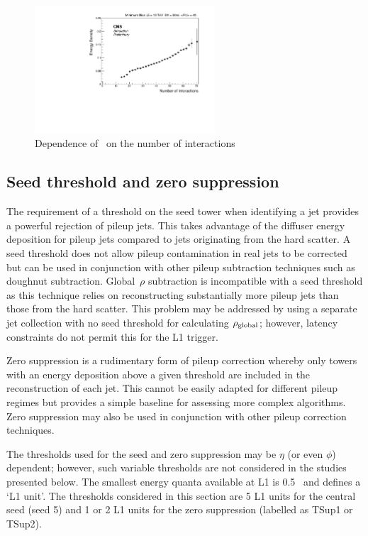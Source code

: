 \begin{figure}
\centering
    \includegraphics[width=0.6\textwidth]{./Figures/triggerUpgrade/threestrips}
  \caption{Dependence of \rhoC~on the number of interactions}
  \label{fig:threestripNint}
\end{figure}  

\subsection{Seed threshold and zero suppression}
\label{sec:seed_thresh}

The requirement of a threshold on the seed tower when identifying a jet
provides a powerful rejection of pileup jets. This takes advantage of the
diffuser energy deposition for pileup jets compared to jets originating from 
the hard scatter. A seed threshold does not allow pileup contamination in real jets to be corrected
but can be used in conjunction with other pileup subtraction techniques such as doughnut
subtraction. Global~$\rho$ subtraction is incompatible with a seed threshold as this technique relies
on reconstructing substantially more pileup jets than those from the hard scatter. 
This problem may be addressed by using a separate jet collection with no seed threshold
for calculating $\rho_{\text{global}}$; however, latency constraints do not permit this for the L1 trigger.

Zero suppression is a rudimentary form of pileup correction whereby only towers with
an energy deposition above a given threshold are included in the reconstruction of each jet.
This cannot be easily adapted for different pileup regimes but provides a simple baseline 
for assessing more complex algorithms. Zero suppression may also be used in conjunction
with other pileup correction techniques. 

The thresholds used for the seed and zero suppression may be $\eta$ (or even $\phi$) dependent; however,
such variable thresholds are not considered in the studies presented below. The smallest energy quanta
available at L1 is 0.5 \GeV~and defines a `L1 unit'. The thresholds considered in this section are 5 L1 units
for the central seed (seed 5) and 1 or 2 L1 units for the zero suppression (labelled as TSup1 or TSup2).

